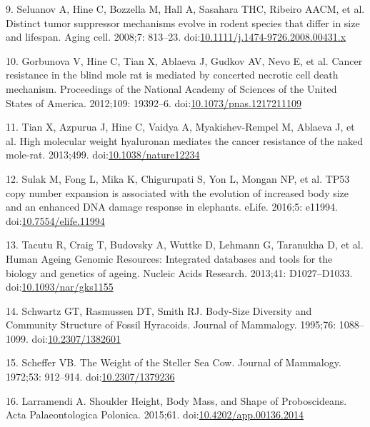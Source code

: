 \documentclass[]{elsarticle} %
\begin{document}
\leavevmode\hypertarget{ref-Seluanov2008}{}%
9. Seluanov A, Hine C, Bozzella M, Hall A, Sasahara THC, Ribeiro AACM,
et al. Distinct tumor suppressor mechanisms evolve in rodent species
that differ in size and lifespan. Aging cell. 2008;7: 813--23.
doi:\href{https://doi.org/10.1111/j.1474-9726.2008.00431.x}{10.1111/j.1474-9726.2008.00431.x}

\leavevmode\hypertarget{ref-Gorbunova2012}{}%
10. Gorbunova V, Hine C, Tian X, Ablaeva J, Gudkov AV, Nevo E, et al.
Cancer resistance in the blind mole rat is mediated by concerted
necrotic cell death mechanism. Proceedings of the National Academy of
Sciences of the United States of America. 2012;109: 19392--6.
doi:\href{https://doi.org/10.1073/pnas.1217211109}{10.1073/pnas.1217211109}

\leavevmode\hypertarget{ref-Tian2013}{}%
11. Tian X, Azpurua J, Hine C, Vaidya A, Myakishev-Rempel M, Ablaeva J,
et al. High molecular weight hyaluronan mediates the cancer resistance
of the naked mole-rat. 2013;499.
doi:\href{https://doi.org/10.1038/nature12234}{10.1038/nature12234}

\leavevmode\hypertarget{ref-Sulak2015}{}%
12. Sulak M, Fong L, Mika K, Chigurupati S, Yon L, Mongan NP, et al.
TP53 copy number expansion is associated with the evolution of increased
body size and an enhanced DNA damage response in elephants. eLife.
2016;5: e11994.
doi:\href{https://doi.org/10.7554/elife.11994}{10.7554/elife.11994}

\leavevmode\hypertarget{ref-HAGR}{}%
13. Tacutu R, Craig T, Budovsky A, Wuttke D, Lehmann G, Taranukha D, et
al. Human Ageing Genomic Resources: Integrated databases and tools for
the biology and genetics of ageing. Nucleic Acids Research. 2013;41:
D1027--D1033.
doi:\href{https://doi.org/10.1093/nar/gks1155}{10.1093/nar/gks1155}

\leavevmode\hypertarget{ref-Schwartz1995}{}%
14. Schwartz GT, Rasmussen DT, Smith RJ. Body-Size Diversity and
Community Structure of Fossil Hyracoids. Journal of Mammalogy. 1995;76:
1088--1099. doi:\href{https://doi.org/10.2307/1382601}{10.2307/1382601}

\leavevmode\hypertarget{ref-Scheffer1972}{}%
15. Scheffer VB. The Weight of the Steller Sea Cow. Journal of
Mammalogy. 1972;53: 912--914.
doi:\href{https://doi.org/10.2307/1379236}{10.2307/1379236}

\leavevmode\hypertarget{ref-Larramendi:20151c2}{}%
16. Larramendi A. Shoulder Height, Body Mass, and Shape of
Proboscideans. Acta Palaeontologica Polonica. 2015;61.
doi:\href{https://doi.org/10.4202/app.00136.2014}{10.4202/app.00136.2014}
\end{document}
